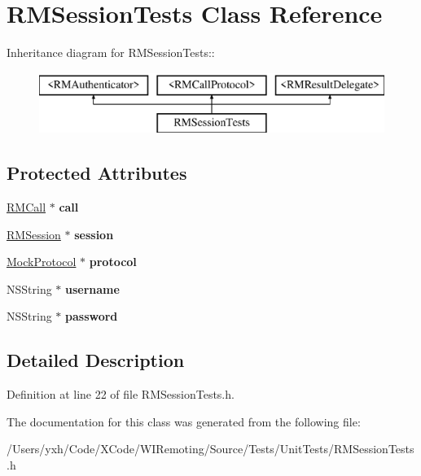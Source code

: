 \hypertarget{interface_r_m_session_tests}{
\section{RMSessionTests Class Reference}
\label{interface_r_m_session_tests}
}
Inheritance diagram for RMSessionTests::\begin{figure}[H]
\begin{center}
\leavevmode
\includegraphics[height=2cm]{interface_r_m_session_tests}
\end{center}
\end{figure}
\subsection*{Protected Attributes}
\begin{DoxyCompactItemize}
\item 
\hypertarget{interface_r_m_session_tests_abeeb4a2ae56b6847a234db1299576652}{
\hyperlink{interface_r_m_call}{RMCall} $\ast$ {\bfseries call}}
\label{interface_r_m_session_tests_abeeb4a2ae56b6847a234db1299576652}

\item 
\hypertarget{interface_r_m_session_tests_a15addac7538f41a12439e0babefa8935}{
\hyperlink{interface_r_m_session}{RMSession} $\ast$ {\bfseries session}}
\label{interface_r_m_session_tests_a15addac7538f41a12439e0babefa8935}

\item 
\hypertarget{interface_r_m_session_tests_a4033c142c7ba3bef1d359ef19b4382a7}{
\hyperlink{interface_mock_protocol}{MockProtocol} $\ast$ {\bfseries protocol}}
\label{interface_r_m_session_tests_a4033c142c7ba3bef1d359ef19b4382a7}

\item 
\hypertarget{interface_r_m_session_tests_ada7aafce83843a941668b5d0f83c9ad3}{
NSString $\ast$ {\bfseries username}}
\label{interface_r_m_session_tests_ada7aafce83843a941668b5d0f83c9ad3}

\item 
\hypertarget{interface_r_m_session_tests_a5b3ca57860668a61e67ded4d00a0eac5}{
NSString $\ast$ {\bfseries password}}
\label{interface_r_m_session_tests_a5b3ca57860668a61e67ded4d00a0eac5}

\end{DoxyCompactItemize}


\subsection{Detailed Description}


Definition at line 22 of file RMSessionTests.h.

The documentation for this class was generated from the following file:\begin{DoxyCompactItemize}
\item 
/Users/yxh/Code/XCode/WIRemoting/Source/Tests/UnitTests/RMSessionTests.h\end{DoxyCompactItemize}
